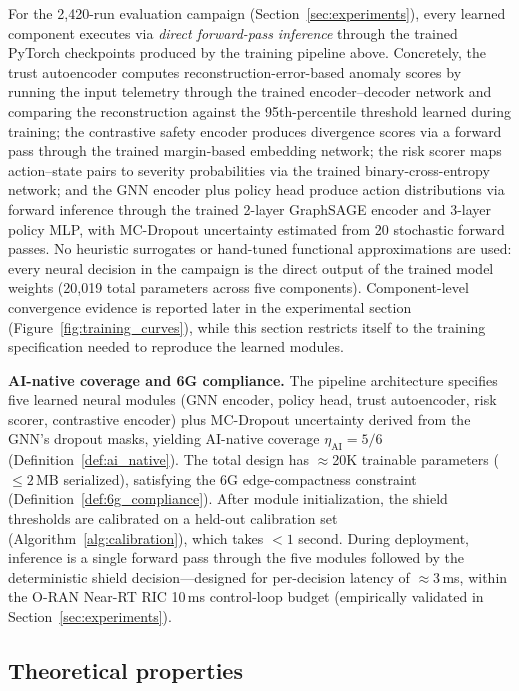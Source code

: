 \documentclass[10pt,journal,compsoc]{IEEEtran}
\begin{document}
\noindent
For the 2,420-run evaluation campaign (Section~\ref{sec:experiments}), every learned component executes via \emph{direct forward-pass inference} through the trained PyTorch checkpoints produced by the training pipeline above.
Concretely, the trust autoencoder computes reconstruction-error-based anomaly scores by running the input telemetry through the trained encoder--decoder network and comparing the reconstruction against the 95th-percentile threshold learned during training; the contrastive safety encoder produces divergence scores via a forward pass through the trained margin-based embedding network; the risk scorer maps action--state pairs to severity probabilities via the trained binary-cross-entropy network; and the GNN encoder plus policy head produce action distributions via forward inference through the trained 2-layer GraphSAGE encoder and 3-layer policy MLP, with MC-Dropout uncertainty estimated from 20 stochastic forward passes.
No heuristic surrogates or hand-tuned functional approximations are used: every neural decision in the campaign is the direct output of the trained model weights (20,019 total parameters across five components).
Component-level convergence evidence is reported later in the experimental section (Figure~\ref{fig:training_curves}), while this section restricts itself to the training specification needed to reproduce the learned modules.

\noindent\textbf{AI-native coverage and 6G compliance.}
The pipeline architecture specifies five learned neural modules (GNN encoder, policy head, trust autoencoder, risk scorer, contrastive encoder) plus MC-Dropout uncertainty derived from the GNN's dropout masks, yielding AI-native coverage $\eta_{\mathrm{AI}} = 5/6$ (Definition~\ref{def:ai_native}).
The total design has $\approx$20K trainable parameters ($\le 2$\,MB serialized), satisfying the 6G edge-compactness constraint (Definition~\ref{def:6g_compliance}).
After module initialization, the shield thresholds are calibrated on a held-out calibration set (Algorithm~\ref{alg:calibration}), which takes $< 1$ second.
During deployment, inference is a single forward pass through the five modules followed by the deterministic shield decision---designed for per-decision latency of $\approx$3\,ms, within the O-RAN Near-RT RIC 10\,ms control-loop budget (empirically validated in Section~\ref{sec:experiments}).


\subsection{Theoretical properties}
\end{document}

